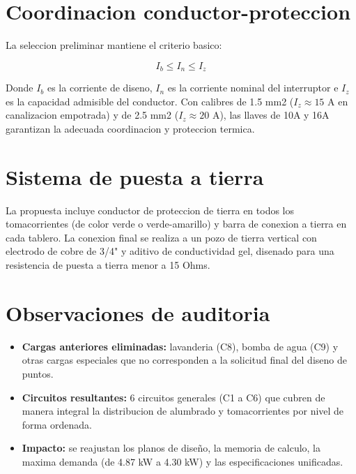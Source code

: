 \section{Coordinacion conductor-proteccion}

La seleccion preliminar mantiene el criterio basico:

\begin{equation}
I_b \leq I_n \leq I_z
\end{equation}

Donde $I_b$ es la corriente de diseno, $I_n$ es la corriente nominal del interruptor e $I_z$ es la capacidad admisible del conductor. Con calibres de 1.5 mm2 ($I_z \approx 15\text{ A}$ en canalizacion empotrada) y de 2.5 mm2 ($I_z \approx 20\text{ A}$), las llaves de 10A y 16A garantizan la adecuada coordinacion y proteccion termica.

\section{Sistema de puesta a tierra}

La propuesta incluye conductor de proteccion de tierra en todos los tomacorrientes (de color verde o verde-amarillo) y barra de conexion a tierra en cada tablero. La conexion final se realiza a un pozo de tierra vertical con electrodo de cobre de 3/4" y aditivo de conductividad gel, disenado para una resistencia de puesta a tierra menor a 15 Ohms.

\section{Observaciones de auditoria}

\begin{itemize}
  \item \textbf{Cargas anteriores eliminadas:} lavanderia (C8), bomba de agua (C9) y otras cargas especiales que no corresponden a la solicitud final del diseno de puntos.
  \item \textbf{Circuitos resultantes:} 6 circuitos generales (C1 a C6) que cubren de manera integral la distribucion de alumbrado y tomacorrientes por nivel de forma ordenada.
  \item \textbf{Impacto:} se reajustan los planos de diseño, la memoria de calculo, la maxima demanda (de 4.87 kW a 4.30 kW) y las especificaciones unificadas.
\end{itemize}
